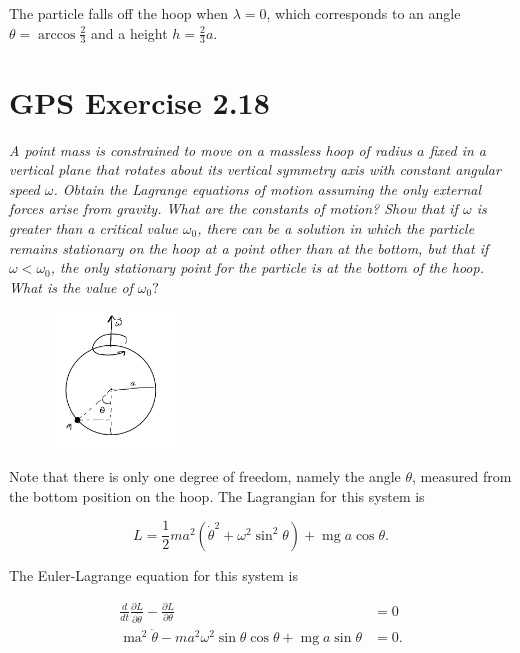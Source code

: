 \documentclass{article}
\begin{document}
The particle falls off the hoop when $\lambda = 0$, which corresponds to an angle $\theta = \arccos\frac{2}{3}$ and a height $h = \frac{2}{3} a$. 
\newpage


\section{GPS Exercise 2.18}
\textit{A point mass is constrained to move on a massless hoop of radius $a$ fixed in a vertical plane that rotates about its vertical symmetry axis with constant angular speed $\omega$. Obtain the Lagrange equations of motion assuming the only external forces arise from gravity. What are the constants of motion? Show that if $\omega$ is greater than a critical value $\omega_{0}$, there can be a solution in which the particle remains stationary on the hoop at a point other than at the bottom, but that if $\omega<\omega_{0}$, the only stationary point for the particle is at the bottom of the hoop. What is the value of $\omega_{0} ?$}

\begin{figure}[h!] 
    \centering
    \includegraphics[width=0.3\textwidth]{figures/problem_18.png}
    \label{fig:my_label}
\end{figure}

Note that there is only one degree of freedom, namely the angle $\theta$, measured from the bottom position on the hoop. The Lagrangian for this system is 

\begin{equation*}
    L=\frac{1}{2} m a^{2}\left(\dot{\theta}^{2}+\omega^{2} \sin ^{2} \theta\right)+\operatorname{mg} a \cos \theta.
\end{equation*}

The Euler-Lagrange equation for this system is 

\begin{align*}
    \frac{d}{d t} \frac{\partial L}{\partial \dot\theta}-\frac{\partial L}{\partial \theta}&=0\\
    \operatorname{ma}^{2} \ddot{\theta}-m a^{2} \omega^{2} \sin \theta \cos \theta+\operatorname{mg} a \sin \theta&=0. 
\end{align*}
\end{document}

